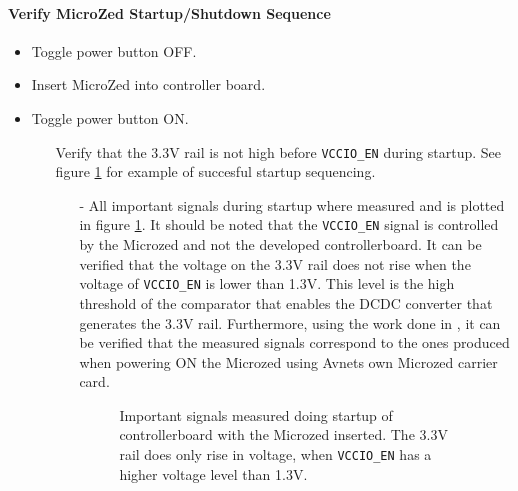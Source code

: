 \paragraph{Verify MicroZed Startup/Shutdown Sequence} %
\label{par:verify_microzed_startup_shutdown_sequence}
\begin{itemize}
	\item Toggle power button OFF.
	\item Insert MicroZed into controller board.
	\item Toggle power button ON.
	\begin{itemize}
		\item[\cmark] Verify that the 3.3V rail is not high before \texttt{VCCIO\_EN} during startup. See figure \ref{fig:controllerboardv2_startup} for example of succesful startup sequencing.
		\begin{itemize}
			\item[-]
			All important signals during startup where measured and is plotted in figure \ref{fig:controllerboardv2_startup}.
			It should be noted that the \texttt{VCCIO\_EN} signal is controlled by the Microzed and not the developed controllerboard. 
			It can be verified that the voltage on the 3.3V rail does not rise when the voltage of \texttt{VCCIO\_EN} is lower than 1.3V.
			This level is the high threshold of the comparator that enables the DCDC converter that generates the 3.3V rail.
			Furthermore, using the work done in \cite{isaswarm}, it can be verified that the measured signals correspond to the ones produced when powering ON the Microzed using Avnets own Microzed carrier card.

 			\begin{figure}[h]
				\centering
			    
				\caption{Important signals measured doing startup of controllerboard with the Microzed inserted. The 3.3V rail does only rise in voltage, when \texttt{VCCIO\_EN} has a higher voltage level than 1.3V.}
				\label{fig:controllerboardv2_startup}
			\end{figure}


\end{itemize}
\end{itemize}
\end{itemize}
